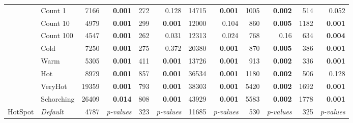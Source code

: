 \begin{table*}
{\begin{tabular}{cl|rr|rr|rr|rr|rr|}
                & Count 1      & 7166                      & \bf 0.001               & 272                          & 0.128                        & 14715                       & \bf 0.001    & 1005 & \bf 0.002    & 514       & 0.052        \\
                & Count 10     & 4979                      & \bf 0.001               & 299                          & \bf 0.001                    & 12000                       & 0.104        & 860  & \bf 0.005    & 1182      & \bf 0.001    \\
                & Count 100    & 4547                      & \bf 0.001               & 262                          & 0.031                        & 12313                       & 0.024        & 768  & 0.16         & 634       & \bf 0.004    \\
                & Cold         & 7250                      & \bf 0.001               & 275                          & 0.372                        & 20380                       & \bf 0.001    & 870  & \bf 0.005    & 386       & \bf 0.001    \\
                & Warm         & 5305                      & \bf 0.001               & 411                          & \bf 0.001                    & 13726                       & \bf 0.001    & 913  & \bf 0.002    & 336       & \bf 0.001    \\
                & Hot          & 8979                      & \bf 0.001               & 857                          & \bf 0.001                    & 36534                       & \bf 0.001    & 1180 & \bf 0.002    & 506       & 0.128        \\
                & VeryHot      & 19359                     & \bf 0.001               & 793                          & \bf 0.001                    & 38303                       & \bf 0.001    & 5420 & \bf 0.002    & 1692      & \bf 0.001    \\
                & Schorching   & 26409                     & \bf 0.014               & 808                          & \bf 0.001                    & 43929                       & \bf 0.001    & 5583 & \bf 0.002    & 1778      & \bf 0.001    \\
            \hline
            \multirow{5}{*}{\sc HotSpot}
                & \em Default  & 4787                      & \em p-values            & 323                          & \em p-values                 & 11685                       & \em p-values & 530  & \em p-values & 325       & \em p-values \\

\end{tabular}}
\end{table*}
